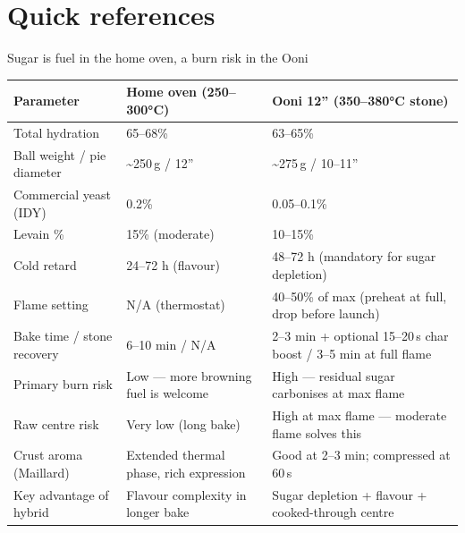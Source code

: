 \documentclass[aspectratio=169,11pt]{beamer}
\newcommand{\ca}{\textasciitilde}
\newcommand{\tablesetup}{\renewcommand{\arraystretch}{1.2}\setlength{\tabcolsep}{4pt}}
\newenvironment{tablebox}[1][\footnotesize]{\par\tablesetup#1}{\par}
\begin{document}
\section{Quick references}

\begin{frame}{Sugar is fuel in the home oven, a burn risk in the Ooni}
  \begin{tablebox}[\scriptsize\renewcommand{\arraystretch}{1.0}\setlength{\tabcolsep}{4pt}]
  \begin{tabularx}{\linewidth}{@{}L{3.1cm}L{4.3cm}Y@{}}
    \toprule
    \textbf{Parameter} & \textbf{Home oven (250--300°C)} & \textbf{Ooni 12” (350--380°C stone)} \\
    \midrule
    Total hydration & 65--68\% & 63--65\% \\
    Ball weight / pie diameter & \ca250\,g / 12” & \ca275\,g / 10--11” \\
    Commercial yeast (IDY) & 0.2\% & 0.05--0.1\% \\
    Levain \% & 15\% (moderate) & 10--15\% \\
    Cold retard & 24--72 h (flavour) & 48--72 h (mandatory for sugar depletion) \\
    Flame setting & N/A (thermostat) & 40--50\% of max (preheat at full, drop before launch) \\
    Bake time / stone recovery & 6--10 min / N/A & 2--3 min + optional 15--20\,s char boost / 3--5 min at full flame \\
    Primary burn risk & Low --- more browning fuel is welcome & High --- residual sugar carbonises at max flame \\
    Raw centre risk & Very low (long bake) & High at max flame --- moderate flame solves this \\
    Crust aroma (Maillard) & Extended thermal phase, rich expression & Good at 2--3 min; compressed at 60\,s \\
    Key advantage of hybrid & Flavour complexity in longer bake & Sugar depletion + flavour + cooked-through centre \\
    \bottomrule
  \end{tabularx}
  \end{tablebox}
\end{frame}
\end{document}

